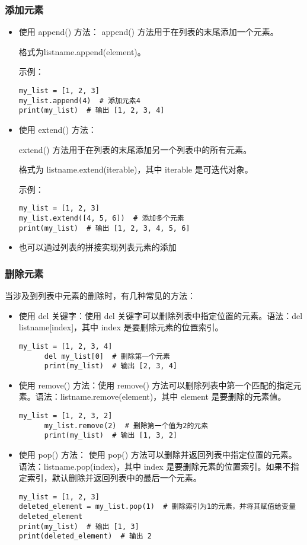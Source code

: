 \documentclass{article}
\begin{document}
\subsubsection{添加元素}
\begin{itemize}
    \item 使用 append() 方法：
    append() 方法用于在列表的末尾添加一个元素。
    \par 格式为listname.append(element)。
    \par 示例：
     \begin{lstlisting}[caption={示例Python代码}]
        my_list = [1, 2, 3]
my_list.append(4)  # 添加元素4
print(my_list)  # 输出 [1, 2, 3, 4]
     \end{lstlisting}
     \item   
     使用 extend() 方法：
     \par extend() 方法用于在列表的末尾添加另一个列表中的所有元素。
    \par  格式为 listname.extend(iterable)，其中 iterable 是可迭代对象。
    \par  示例：
     \begin{lstlisting}[caption={示例Python代码}]
 my_list = [1, 2, 3]
my_list.extend([4, 5, 6])  # 添加多个元素
print(my_list)  # 输出 [1, 2, 3, 4, 5, 6]
     \end{lstlisting}
     \item 也可以通过列表的拼接实现列表元素的添加
\end{itemize}
\subsubsection{删除元素}
当涉及到列表中元素的删除时，有几种常见的方法：
\begin{itemize}
    \item 使用 del 关键字：使用 del 关键字可以删除列表中指定位置的元素。语法：del listname[index]，其中 index 是要删除元素的位置索引。
    \begin{lstlisting}[caption={示例Python代码}]
      my_list = [1, 2, 3, 4]
      del my_list[0]  # 删除第一个元素
      print(my_list)  # 输出 [2, 3, 4]
    \end{lstlisting}
    \item 使用 remove() 方法：使用 remove() 方法可以删除列表中第一个匹配的指定元素。语法：listname.remove(element)，其中 element 是要删除的元素值。
     \begin{lstlisting}[caption={示例Python代码}]
      my_list = [1, 2, 3, 2]
      my_list.remove(2)  # 删除第一个值为2的元素
      print(my_list)  # 输出 [1, 3, 2]
     \end{lstlisting}
    \item 使用 pop() 方法：
使用 pop() 方法可以删除并返回列表中指定位置的元素。
语法：listname.pop(index)，其中 index 是要删除元素的位置索引。如果不指定索引，默认删除并返回列表中的最后一个元素。
\begin{lstlisting}[caption={示例Python代码}]
my_list = [1, 2, 3]
deleted_element = my_list.pop(1)  # 删除索引为1的元素，并将其赋值给变量deleted_element
print(my_list)  # 输出 [1, 3]
print(deleted_element)  # 输出 2
\end{lstlisting}
\end{itemize}
\end{document}
